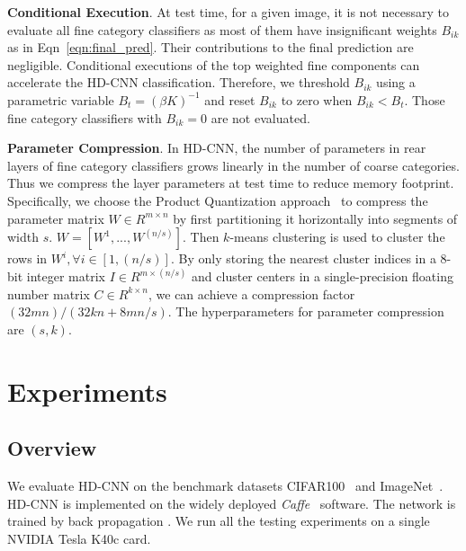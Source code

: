 \documentclass[10pt,twocolumn,letterpaper]{article}
\begin{document}
\noindent \textbf{Conditional Execution}. At test time, for a given image, it is not necessary to evaluate all fine category classifiers as most of them have insignificant weights $B_{ik}$ as in Eqn~\ref{eqn:final_pred}. Their contributions to the final prediction are negligible. Conditional executions of the top weighted fine components can accelerate the HD-CNN classification. Therefore, we threshold $B_{ik}$ using a parametric variable $B_t=(\beta K)^{-1}$ and reset $B_{ik}$ to zero when $B_{ik}<B_t$. Those fine category classifiers with $B_{ik}=0$ are not evaluated.

\noindent \textbf{Parameter Compression}. In HD-CNN, the number of parameters in rear layers of fine category classifiers grows linearly in the number of coarse categories. Thus we compress the layer parameters at test time to reduce memory footprint. Specifically, we choose the Product Quantization approach~\cite{jegou2011product} to compress the parameter matrix $W \in R^{m\times n}$ by first partitioning it horizontally into segments of width $s$. $W=[W^1, ..., W^{(n/s)}]$. Then $k$-means clustering is used to cluster the rows in $W^i, \forall i\in [1,(n/s)]$. By only storing the nearest cluster indices in a 8-bit integer matrix $I \in R^{m\times (n/s)}$ and cluster centers in a single-precision floating number matrix $C \in R^{k\times n}$, we can achieve a compression factor $(32mn)/(32kn+8mn/s)$. The hyperparameters for parameter compression are $(s,k)$.

\section{Experiments}
\label{sec:experiments}

\subsection{Overview}
We evaluate HD-CNN on the benchmark datasets  CIFAR100~\cite{krizhevsky2009learning} and ImageNet~\cite{deng2009imagenet}. HD-CNN is implemented on the widely deployed \textit{Caffe}~\cite{Jia13caffe} software. The network is trained by back propagation \cite{krizhevsky2012imagenet}. We run all the testing experiments on a single NVIDIA Tesla K40c card.
\end{document}
